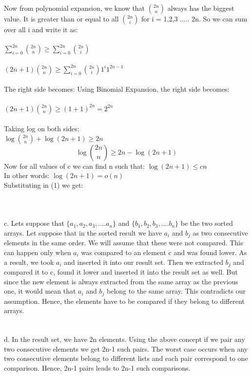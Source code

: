\documentclass[10pt]{article}
\begin{document}
Now from polynomial expansion, we know that ${2n\choose n}$ always has the biggest value. It is greater than or equal to all ${2n\choose i}$ for i = 1,2,3 ..... 2n. So we can sum over all i and write it as:\\\\
$\sum_{i=0}^{2n}{2n\choose n} \geq \sum_{i=0}^{2n}{2n\choose i}$\\\\
$(2n+1){2n\choose n} \geq \sum_{i=0}^{2n}{2n\choose i}1^i1^{2n-1}$\\\\
The right side becomes: 
Using Binomial Expansion, the right side becomes: \\\\
 $(2n+1){2n\choose n} \geq (1+1)^{2n} = 2^{2n}$\\\\
Taking log on both sides: \\
$\log {2n\choose n} + \log ({2n+1}) \geq 2n$\\
\begin{equation}
\log {2n\choose n} \geq 2n - \log ({2n+1})
\end{equation}
Now for all values of c we can find n such that: $\log ({2n+1}) \leq cn$ \\
In other words: $\log ({2n+1}) = o(n)$ \\
Substituting in (1) we get:\\
\\\\\\
c. Lets suppose that $\{a_1, a_2, a_3, .... a_n\}$ and $\{b_1, b_2, b_3, .... b_n\}$ be the two sorted arrays. Let suppose that in the sorted result we have $a_i$ and $b_j$ as two consecutive elements in the same order. We will assume that these were not compared. This can happen only when $a_i$ was compared to an element c and was found lower. As a result, we took $a_i$ and inserted it into our result  set. Then we extracted $b_j$ and compared it to c, found it lower and inserted it into the result set as well. But since the new element is always extracted from the same array as the previous one, it would mean that $a_i$ and $b_j$ belong to the same array. This contradicts our assumption. Hence, the elements have to be compared if they belong to different arrays.\\\\\\
d. In the result set, we have 2n elements. Using the above concept if we pair any two consecutive elements we get 2n-1 such pairs. The worst case occurs when any two consecutive elements belong to different lists and each pair correspond to one comparison. Hence, 2n-1 pairs leads to 2n-1 such comparisons.
\newpage
\end{document}
